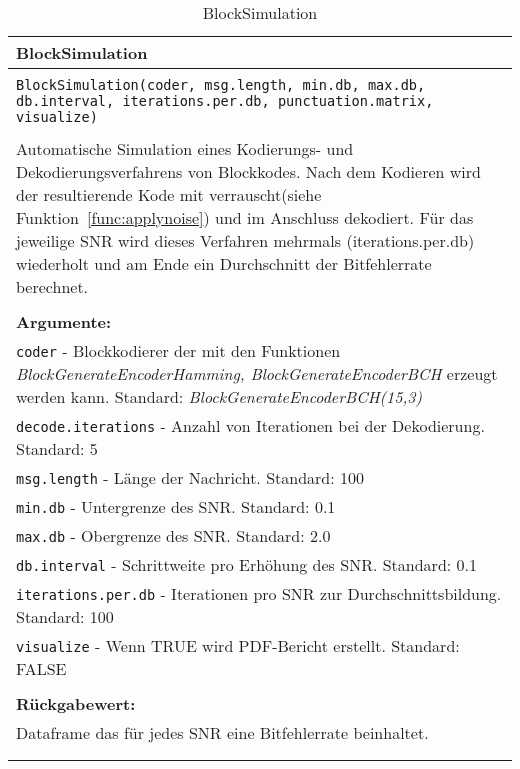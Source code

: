 \begin{longtable}{|p{\textwidth}|}
\hline
\rowcolor{lightblue}BlockSimulation\\
\hline
\\
\texttt{BlockSimulation(coder, msg.length, min.db, max.db, db.interval, iterations.per.db, punctuation.matrix, visualize)}\\
\\
Automatische Simulation eines Kodierungs- und Dekodierungsverfahrens von Blockkodes. Nach dem Kodieren wird der resultierende Kode mit verrauscht(siehe Funktion~\ref{func:applynoise}) und im Anschluss dekodiert. Für das jeweilige SNR wird dieses Verfahren mehrmals (iterations.per.db) wiederholt und am Ende ein Durchschnitt der Bitfehlerrate berechnet.\\
\\
\textbf{Argumente:}\\
\texttt{coder} - Blockkodierer der mit den Funktionen \emph{BlockGenerateEncoderHamming, BlockGenerateEncoderBCH} erzeugt werden kann. Standard: \emph{BlockGenerateEncoderBCH(15,3)}\\
\texttt{decode.iterations} - Anzahl von Iterationen bei der Dekodierung. Standard: 5\\
\texttt{msg.length} - Länge der Nachricht. Standard: 100\\
\texttt{min.db} - Untergrenze des SNR. Standard: 0.1\\
\texttt{max.db} - Obergrenze des SNR. Standard: 2.0\\
\texttt{db.interval} - Schrittweite pro Erhöhung des SNR. Standard: 0.1\\
\texttt{iterations.per.db} - Iterationen pro SNR zur Durchschnittsbildung. Standard: 100\\
\texttt{visualize} - Wenn TRUE wird PDF-Bericht erstellt. Standard: FALSE\\
\\
\textbf{Rückgabewert:}\\
Dataframe das für jedes SNR eine Bitfehlerrate beinhaltet.\\
\\
\hline
\caption{BlockSimulation}
\end{longtable}
